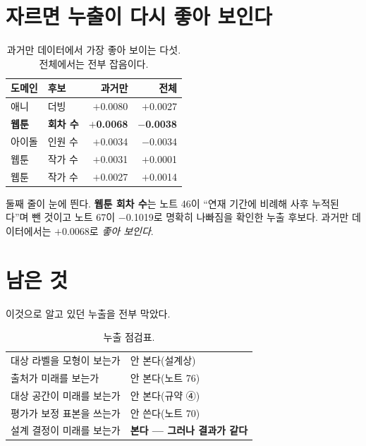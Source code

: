 \documentclass[10pt]{article}
\begin{document}
\section{자르면 누출이 다시 좋아 보인다}

\begin{table}[t]
\centering\tsize
\caption{과거만 데이터에서 가장 좋아 보이는 다섯. 전체에서는 전부 잡음이다.}
\begin{tabular}{llrr}
\toprule
도메인 & 후보 & 과거만 & 전체 \\
\midrule
애니 & 더빙 & $+$0.0080 & $+$0.0027 \\
\textbf{웹툰} & \textbf{회차 수} & \textbf{$+$0.0068} & \textbf{$-$0.0038} \\
아이돌 & 인원 수 & $+$0.0034 & $-$0.0034 \\
웹툰 & 작가 수 & $+$0.0031 & $+$0.0001 \\
웹툰 & 작가 수 & $+$0.0027 & $+$0.0014 \\
\bottomrule
\end{tabular}
\end{table}

둘째 줄이 눈에 띈다. \textbf{웹툰 회차 수}는 노트 46이 ``연재 기간에 비례해
사후 누적된다''며 뺀 것이고 노트 67이 $-$0.1019로 명확히 나빠짐을 확인한
누출 후보다. 과거만 데이터에서는 $+$0.0068로 \emph{좋아 보인다}.


\section{남은 것}

이것으로 알고 있던 누출을 전부 막았다.

\begin{table}[t]
\centering\tsize
\caption{누출 점검표.}
\begin{tabular}{ll}
\toprule
대상 라벨을 모형이 보는가 & 안 본다(설계상) \\
출처가 미래를 보는가 & 안 본다(노트 76) \\
대상 공간이 미래를 보는가 & 안 본다(규약 ④) \\
평가가 보정 표본을 쓰는가 & 안 쓴다(노트 70) \\
설계 결정이 미래를 보는가 & \textbf{본다 --- 그러나 결과가 같다} \\
\bottomrule
\end{tabular}
\end{table}
\end{document}
